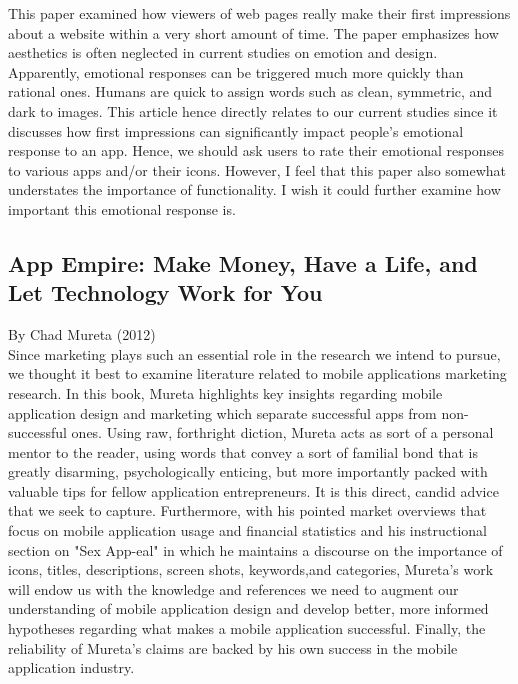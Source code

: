This paper examined how viewers of web pages really make their first impressions about a website within a very short amount of time. The paper emphasizes how aesthetics is often neglected in current studies on emotion and design. Apparently, emotional responses can be triggered much more quickly than rational ones. Humans are quick to assign words such as clean, symmetric, and dark to images. This article hence directly relates to our current studies since it discusses how first impressions can significantly impact people's emotional response to an app. Hence, we should ask users to rate their emotional responses to various apps and/or their icons. However, I feel that this paper also somewhat understates the importance of functionality. I wish it could further examine how important this emotional response is.

\subsection{App Empire: Make Money, Have a Life, and Let Technology Work for You}

By Chad Mureta (2012) \\

Since marketing plays such an essential role in the research we intend to pursue, we thought it best to examine literature related to mobile applications marketing research. In this book, Mureta highlights key insights regarding mobile application design and marketing which separate successful apps from non-successful ones.  Using raw, forthright diction, Mureta acts as sort of a personal mentor to the reader, using words that convey a sort of familial bond that is greatly disarming, psychologically enticing, but more importantly packed with valuable tips for fellow application entrepreneurs.  It is this direct, candid advice that we seek to capture.  Furthermore, with his pointed market overviews that focus on mobile application usage and financial statistics and his instructional section on "Sex App-eal" in which he maintains a discourse on the importance of icons, titles, descriptions, screen shots, keywords,and categories, Mureta's work will endow us with the knowledge and references we need to augment our understanding of mobile application design and develop better, more informed hypotheses regarding what makes a mobile application successful. Finally, the reliability of Mureta's claims are backed by his own success in the mobile application industry.\cite {mureta} \\

